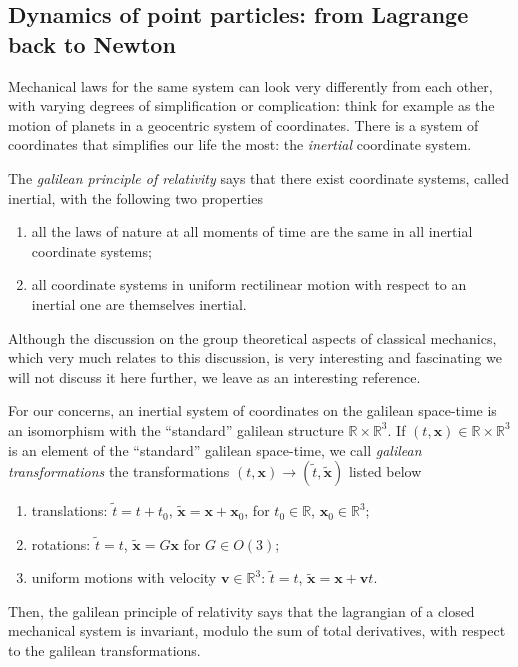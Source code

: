 \documentclass[english,fontsize=11pt,paper=a5,oneside]{scrbook}
\newcommand{\R}{\mathbb{R}}
\newcommand{\bx}{\bm{x}}
\theoremstyle{definition}
\begin{document}
\subsection{Dynamics of point particles: from Lagrange back to Newton}\label{sec:dynamicspps}

Mechanical laws for the same system can look very differently from each other, with varying degrees of simplification or complication: think for example as the motion of planets in a geocentric system of coordinates.
There is a system of coordinates that simplifies our life the most: the \emph{inertial} coordinate system.

\begin{tcolorbox}
The \emph{galilean principle of relativity} says that there exist coordinate systems, called inertial, with the following two properties
\begin{enumerate}
    \item all the laws of nature at all moments of time are the same in all inertial coordinate systems;
    \item all coordinate systems in uniform rectilinear motion with respect to an inertial one are themselves inertial.
\end{enumerate}
\end{tcolorbox}

Although the discussion on the group theoretical aspects of classical mechanics, which very much relates to this discussion, is very interesting and fascinating we will not discuss it here further, we leave \cite{book:marsdenratiu} as an interesting reference.

For our concerns, an inertial system of coordinates on the galilean space-time is an isomorphism with the ``standard'' galilean structure $\R\times\R^3$.
If $(t, \bx) \in \R\times \R^3$ is an element of the ``standard'' galilean space-time, we call \emph{galilean transformations} the transformations $(t,\bx) \to (\widetilde t, \widetilde{\bx})$ listed below
\begin{enumerate}
    \item translations: $\widetilde t = t + t_0$, $\widetilde{\bx} = \bx + \bx_0$, for $t_0\in\R$, $\bx_0\in\R^3$;
    \item rotations: $\widetilde t = t$, $\widetilde{\bx} = G\bx$ for $G\in O(3)$;
    \item uniform motions with velocity $\bm{v}\in\R^3$: $\widetilde t = t$, $\widetilde{\bx} = \bx + \bm{v} t$.
\end{enumerate}
Then, the galilean principle of relativity says that the lagrangian of a closed mechanical system is invariant, modulo the sum of total derivatives, with respect to the galilean transformations.
\end{document}

